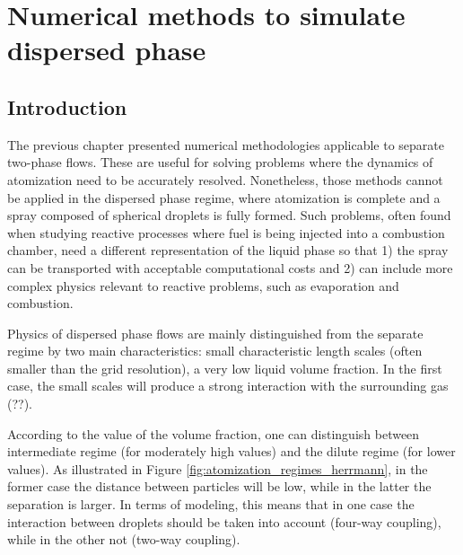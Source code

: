 \chapter{Numerical methods to simulate dispersed phase}
\label{ch3:disperse_phase_methods}

\section{Introduction}

The previous chapter presented numerical methodologies applicable to separate two-phase flows. These are useful for solving problems where the dynamics of atomization need to be accurately resolved. Nonetheless, those methods cannot be applied in the dispersed phase regime, where atomization is complete and a spray composed of spherical droplets is fully formed. Such problems, often found when studying reactive processes where fuel is being injected into a combustion chamber, need a different representation of the liquid phase so that 1) the spray can be transported with acceptable computational costs and 2) can include more complex physics relevant to reactive problems, such as evaporation and combustion.

Physics of dispersed phase flows are mainly distinguished from the separate regime by two main characteristics: small characteristic length scales (often smaller than the grid resolution), a very low liquid volume fraction. In the first case, the small scales will produce a strong interaction with the surrounding gas (??).

According to the value of the volume fraction, one can distinguish between intermediate regime (for moderately high values) and the dilute regime (for lower values). As illustrated in Figure \ref{fig:atomization_regimes_herrmann}, in the former case the distance between particles will be low, while in the latter the separation is larger. In terms of modeling, this means that in one case the interaction between droplets should be taken into account (four-way coupling), while in the other not (two-way coupling). 


